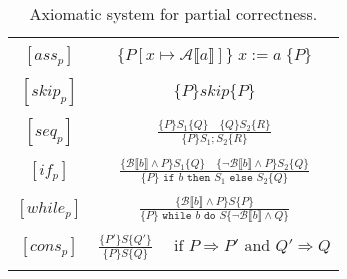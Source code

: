 \begin{table}[h!]
\centering
\begin{tabular}{|c c|} 
 \hline
	& \\
 $[ass_p ]$ & $\{ P[x \mapsto \mathcal{A} \llbracket a \rrbracket ] \} \; x := a \; \{ P \}$ \\ 
	& \\
 $[skip_p ]$ & $\{ P \} skip \{ P \}$ \\ 
	& \\
 $[seq_p ]$ & 
		$\frac{\{ P \} S_1 \{Q \} \quad \{ Q\} S_2 \{ R \}}{\{ P \} S_1;S_2 \{ R \}}$ \\ 
	& \\
 $[if_p ]$ & 
		$\frac{ \{\mathcal{B} \llbracket b \rrbracket \land P \} S_1 \{ Q \} \quad 
           \{ \neg \mathcal{B} \llbracket b \rrbracket \land P\} S_2 \{ Q \} }
          {\{P\} \texttt{ if } b \texttt{ then } S_1 \texttt{ else } S_2 \{Q\}}$ \\
	& \\
 $[while_p ]$ & 
		$\frac{ \{\mathcal{B} \llbracket b \rrbracket \land P \} S \{ P \}}
          {\{P\} \texttt{ while } b \texttt{ do } S 
           \{\neg \mathcal{B} \llbracket b \rrbracket \land Q\}}$ \\
	& \\
 $[cons_p ]$ & 
		$\frac{ \{P'\} S \{Q'\}}{\{P\} S \{Q\}} \quad 
     \text{ if } P \Rightarrow P' \text{ and } Q' \Rightarrow Q $ \\
	& \\
 \hline
\end{tabular}
\caption{Axiomatic system for partial correctness.}
\label{table:axiomatic}
\end{table}





